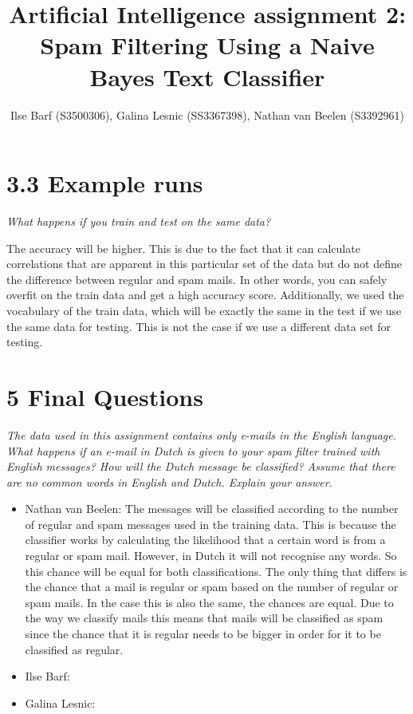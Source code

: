 \documentclass{article}
\title{Artificial Intelligence assignment 2: Spam Filtering Using a Naive Bayes Text Classifier}
\author{Ilse Barf (S3500306), Galina Lesnic (SS3367398), Nathan van Beelen (S3392961)}
\begin{document}
\maketitle

\section*{3.3 Example runs}
\textit{What happens if you train and test on the same data?}

The accuracy will be higher. This is due to the fact that it can calculate
correlations that are apparent in this particular set of the data but do not
define the difference between regular and spam mails. In other words, you can
safely overfit on the train data and get a high accuracy score. Additionally,
we used the vocabulary of the train data, which will be exactly the same in the
test if we use the same data for testing. This is not the case if we use a
different data set for testing.

\section*{5 Final Questions}
\textit{The  data  used  in  this  assignment  contains  only  e-mails  in  the  English  language.
What happens if an e-mail in Dutch is given to your spam filter trained with English messages?
How  will  the  Dutch  message  be  classified?   Assume  that  there  are  no  common  words  in
English and Dutch.  Explain your answer.}
\begin{itemize}
    \item Nathan van Beelen: The messages will be classified according to the number of
          regular and spam messages used in the training data.
          This is because the classifier works by calculating the likelihood that a
          certain word is from a regular or spam mail. However, in Dutch it will not
          recognise any words. So this chance will be equal for both classifications.
          The only thing that differs is the chance that a mail is regular or spam based
          on the number of regular or spam mails. In the case this is also the same,
          the chances are equal. Due to the way we classify mails this means that
          mails will be classified as spam since the chance that it is regular needs
          to be bigger in order for it to be classified as regular.
    \item Ilse Barf:
    \item Galina Lesnic:
\end{itemize}
\end{document}
